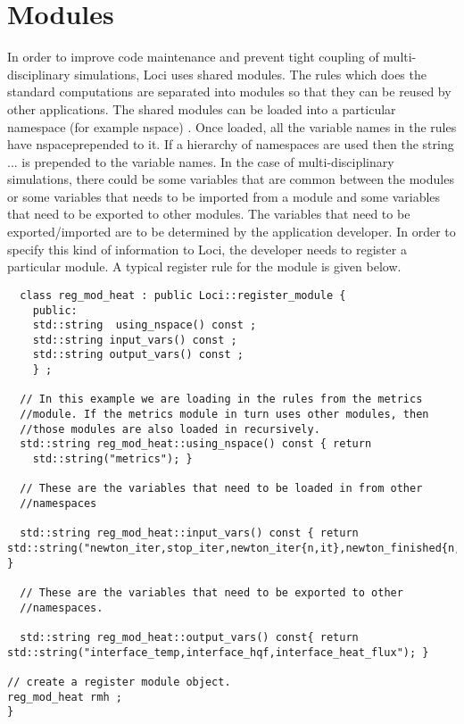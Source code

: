 
\chapter {Modules}

In order to improve code maintenance and prevent tight coupling of
multi-disciplinary simulations, Loci uses shared modules. The rules
which does the standard computations are separated into modules so that they
can be reused by other applications. The shared modules can be loaded
into a particular namespace (for example nspace) . Once loaded, all
the variable names in the rules have nspace\@ prepended to it. If a
hierarchy of namespaces are used then the string \@...
is prepended to the variable names. 
%
In the case of multi-disciplinary simulations, there could be some
variables that are common between the modules or some variables that
needs to be imported from a module and some variables that need to be
exported to other modules. The variables that need to be
exported/imported are to be determined by the application
developer. In order to specify this kind of information to Loci, the
developer needs to register a particular module. A typical register
rule for the module is given below. 

\begin{verbatim} 
  class reg_mod_heat : public Loci::register_module {
    public:
    std::string  using_nspace() const ;
    std::string input_vars() const ;
    std::string output_vars() const ;
    } ;

  // In this example we are loading in the rules from the metrics
  //module. If the metrics module in turn uses other modules, then
  //those modules are also loaded in recursively.  
  std::string reg_mod_heat::using_nspace() const { return
    std::string("metrics"); }  
  
  // These are the variables that need to be loaded in from other
  //namespaces

  std::string reg_mod_heat::input_vars() const { return std::string("newton_iter,stop_iter,newton_iter{n,it},newton_finished{n,it},UNIVERSE,EMPTY,OUTPUT{n,it},OUTPUT{n},timestep_finished{n},ncycle{n},stime{n},do_output{n}"); }
  
  // These are the variables that need to be exported to other
  //namespaces.

  std::string reg_mod_heat::output_vars() const{ return std::string("interface_temp,interface_hqf,interface_heat_flux"); } 
  
// create a register module object. 
reg_mod_heat rmh ;
}
\end{verbatim}

